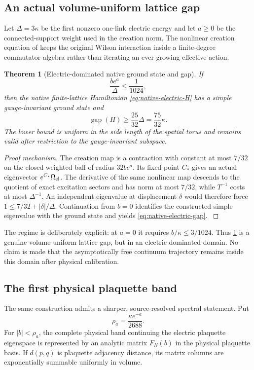 \documentclass[11pt,oneside,openany]{book}
\newtheorem{theorem}{Theorem}[chapter]
\theoremstyle{definition}
\theoremstyle{remark}
\newcommand{\gap}{\operatorname{gap}}
\newcommand{\src}[2]{\cite[#2]{#1}}
\begin{document}
\subsection{An actual volume-uniform lattice gap}
Let $\Delta=3\kappa$ be the first nonzero one-link electric energy and
let $a\ge0$ be the connected-support weight used in the creation norm.
The nonlinear creation equation of \src{F18}{V5} keeps the original
Wilson interaction inside a finite-degree commutator algebra rather than
iterating an ever growing effective action.

\begin{theorem}[Electric-dominated native ground state and gap]
\label{thm:native-electric-gap}
If
\begin{equation}\label{eq:native-electric-smallness}
 \frac{be^a}{\Delta}\le\frac1{1024},
\end{equation}
then the native finite-lattice Hamiltonian \cref{eq:native-electric-H}
has a simple gauge-invariant ground state and
\begin{equation}\label{eq:native-electric-gap}
 \gap(H)\ge\frac{25}{32}\Delta=\frac{75}{32}\kappa .
\end{equation}
The lower bound is uniform in the side length of the spatial torus and
remains valid after restriction to the gauge-invariant subspace.
\end{theorem}
\begin{proof}[Proof mechanism]
The creation map is a contraction with constant at most $7/32$ on the
closed weighted ball of radius $32be^a$.  Its fixed point $C_*$ gives an
actual eigenvector $e^{C_*}\Omega_{\rm el}$.  The derivative of the
same nonlinear map descends to the quotient of exact excitation
sectors and has norm at most $7/32$, while $T^{-1}$ costs at most
$\Delta^{-1}$.  An independent eigenvalue at displacement $\delta$
would therefore force
$1\le7/32+|\delta|/\Delta$.  Continuation from $b=0$ identifies the
constructed simple eigenvalue with the ground state and yields
\cref{eq:native-electric-gap}.  \src{F18}{V5}
\end{proof}

The regime is deliberately explicit: at $a=0$ it requires
$b/\kappa\le3/1024$.  Thus \cref{thm:native-electric-gap} is a genuine
volume-uniform lattice gap, but in an electric-dominated domain.  No
claim is made that the asymptotically free continuum trajectory remains
inside this domain after physical calibration.

\subsection{The first physical plaquette band}
The same construction admits a sharper, source-resolved spectral
statement.  Put
\begin{equation}\label{eq:native-band-radius}
 \rho_a=\frac{\kappa e^{-a}}{2688}.
\end{equation}
For $|b|<\rho_a$, the complete physical band continuing the electric
plaquette eigenspace is represented by an analytic matrix $F_N(b)$ in
the physical plaquette basis.  If $d(p,q)$ is plaquette adjacency
distance, its matrix columns are exponentially summable uniformly in
volume.
\end{document}
